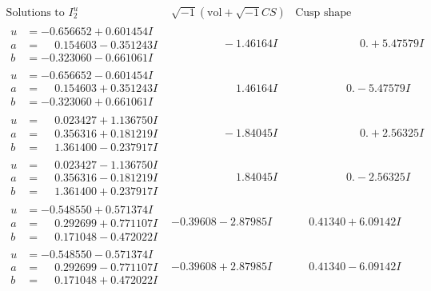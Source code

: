 \documentclass[1p]{elsarticle_modified}
\theoremstyle{definition}
\newcommand{\I}{\sqrt{-1}}
\begin{document}
$$\begin{array}{c|c|c}  
\text{Solutions to }I^u_{2}& \I (\text{vol} + \sqrt{-1}CS) & \text{Cusp shape}\\
 \hline 
\begin{aligned}
u &= -0.656652 + 0.601454 I \\
a &= \phantom{-}0.154603 - 0.351243 I \\
b &= -0.323060 - 0.661061 I\end{aligned}
 & \phantom{-0.000000 } -1.46164 I & \phantom{-0.000000 -}0. + 5.47579 I \\ \hline\begin{aligned}
u &= -0.656652 - 0.601454 I \\
a &= \phantom{-}0.154603 + 0.351243 I \\
b &= -0.323060 + 0.661061 I\end{aligned}
 & \phantom{-0.000000 -}1.46164 I & \phantom{-0.000000 } 0. - 5.47579 I \\ \hline\begin{aligned}
u &= \phantom{-}0.023427 + 1.136750 I \\
a &= \phantom{-}0.356316 + 0.181219 I \\
b &= \phantom{-}1.361400 - 0.237917 I\end{aligned}
 & \phantom{-0.000000 } -1.84045 I & \phantom{-0.000000 -}0. + 2.56325 I \\ \hline\begin{aligned}
u &= \phantom{-}0.023427 - 1.136750 I \\
a &= \phantom{-}0.356316 - 0.181219 I \\
b &= \phantom{-}1.361400 + 0.237917 I\end{aligned}
 & \phantom{-0.000000 -}1.84045 I & \phantom{-0.000000 } 0. - 2.56325 I \\ \hline\begin{aligned}
u &= -0.548550 + 0.571374 I \\
a &= \phantom{-}0.292699 + 0.771107 I \\
b &= \phantom{-}0.171048 - 0.472022 I\end{aligned}
 & -0.39608 - 2.87985 I & \phantom{-}0.41340 + 6.09142 I \\ \hline\begin{aligned}
u &= -0.548550 - 0.571374 I \\
a &= \phantom{-}0.292699 - 0.771107 I \\
b &= \phantom{-}0.171048 + 0.472022 I\end{aligned}
 & -0.39608 + 2.87985 I & \phantom{-}0.41340 - 6.09142 I \\ \hline\begin{aligned}

\end{aligned}
\end{array}$$
\end{document}
